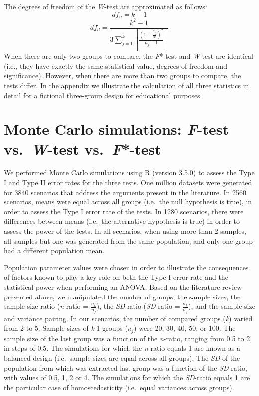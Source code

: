 \documentclass[man,floatsintext]{apa6}
\begin{document}
The degrees of freedom of the \emph{W}-test are approximated as follows:
\begin{equation} 
df_n= k-1
\label{eq:WnumDF}
\end{equation}
\begin{equation}
df_d= \frac{k^2-1}{3\sum_{j=1}^k[\frac{(1-\frac{w_j}{w})^2}{n_j-1}]}
\label{eq:WdenomDF}
\end{equation}
When there are only two groups to compare, the \emph{F}*-test and \emph{W}-test are identical (i.e., they have exactly the same statistical value, degrees of freedom and significance). However, when there are more than two groups to compare, the tests differ. In the appendix we illustrate the calculation of all three statistics in detail for a fictional three-group design for educational purposes.

\hypertarget{monte-carlo-simulations-f-test-vs.-w-test-vs.-f-test}{%
\section{\texorpdfstring{Monte Carlo simulations: \emph{F}-test vs.~\emph{W}-test vs.~\emph{F}*-test}{Monte Carlo simulations: F-test vs.~W-test vs.~F*-test}}\label{monte-carlo-simulations-f-test-vs.-w-test-vs.-f-test}}

We performed Monte Carlo simulations using R (version 3.5.0) to assess the Type I and Type II error rates for the three tests. One million datasets were generated for 3840 scenarios that address the arguments present in the literature. In 2560 scenarios, means were equal across all groups (i.e.~the null hypothesis is true), in order to assess the Type I error rate of the tests. In 1280 scenarios, there were differences between means (i.e.~the alternative hypothesis is true) in order to assess the power of the tests. In all scenarios, when using more than 2 samples, all samples but one was generated from the same population, and only one group had a different population mean.

Population parameter values were chosen in order to illustrate the consequences of factors known to play a key role on both the Type I error rate and the statistical power when performing an ANOVA. Based on the literature review presented above, we manipulated the number of groups, the sample sizes, the sample size ratio (\emph{n}-ratio = \(\frac{n_k}{n_j}\)), the \emph{SD}-ratio (\emph{SD}-ratio = \(\frac{\sigma_k}{\sigma_j}\)), and the sample size and variance pairing. In our scenarios, the number of compared groups (\emph{k}) varied from 2 to 5. Sample sizes of \emph{k}-1 groups (\(n_j\)) were 20, 30, 40, 50, or 100. The sample size of the last group was a function of the \emph{n}-ratio, ranging from 0.5 to 2, in steps of 0.5. The simulations for which the \emph{n}-ratio equals 1 are known as a balanced design (i.e.~sample sizes are equal across all groups). The \emph{SD} of the population from which was extracted last group was a function of the \emph{SD}-ratio, with values of 0.5, 1, 2 or 4. The simulations for which the \emph{SD}-ratio equals 1 are the particular case of homoscedasticity (i.e.~equal variances across groups).
\end{document}
